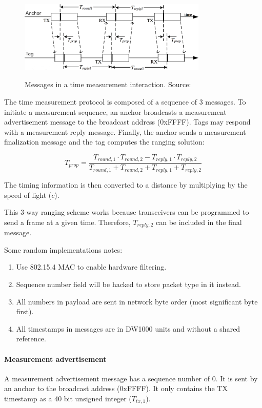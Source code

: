 \documentclass[a4paper, 12pt]{scrreprt}
\begin{document}
\begin{figure}[h]
    \centering
    \includegraphics[width=0.8\textwidth]{figures/ranging_protocol.png}
    \label{fig:ranging_protocol}
    \caption[Ranging protocol]{Messages in a time measurement interaction. Source:~\cite{dw1000manual}}
\end{figure}

The time measurement protocol is composed of a sequence of 3 messages.
To initiate a measurement sequence, an anchor broadcasts a measurement advertisement message to the broadcast address (0xFFFF).
Tags may respond with a measurement reply message.
Finally, the anchor sends a measurement finalization message and the tag computes the ranging solution:

\begin{equation}
T_{prop} = \frac{T_{round,1} \cdot T_{round,2} - T_{reply,1} \cdot T_{reply,2}}{T_{round,1} + T_{round,2} + T_{reply,1} + T_{reply,2}}
\label{eqn:ranging}
\end{equation}

The timing information is then converted to a distance by multiplying by the speed of light ($c$).

This 3-way ranging scheme works because transceivers can be programmed to send a frame at a given time.
Therefore, $T_{reply,2}$ can be included in the final message.

Some random implementations notes:

\begin{enumerate}
    \item Use 802.15.4 MAC to enable hardware filtering.
    \item Sequence number field will be hacked to store packet type in it instead.
    \item All numbers in payload are sent in network byte order (most significant byte first).
    \item All timestamps in messages are in DW1000 units and without a shared reference.
\end{enumerate}

\paragraph{Measurement advertisement}
A measurement advertisement message has a sequence number of 0.
It is sent by an anchor to the broadcast address (0xFFFF).
It only contains the TX timestamp as a 40 bit unsigned integer ($T_{tx,1}$).
\end{document}
